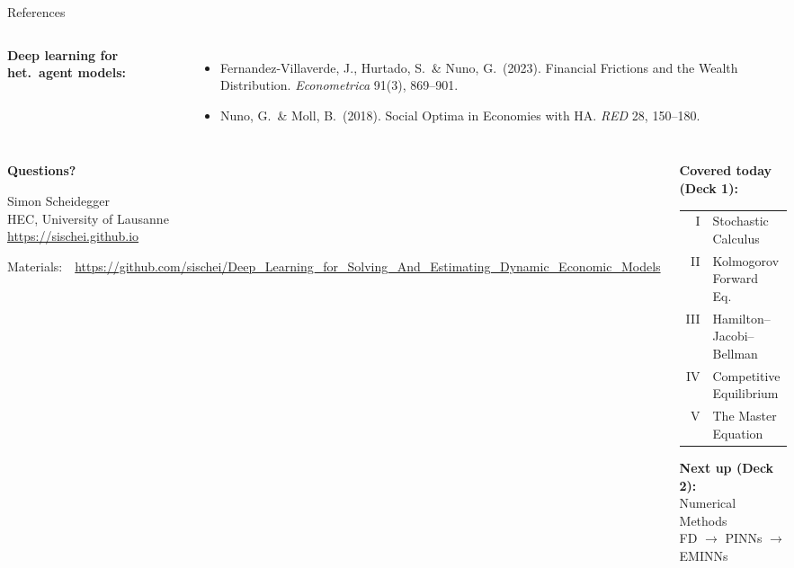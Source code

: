 \documentclass[aspectratio=169,11pt]{beamer}
\begin{document}
\begin{frame}{References}
\begin{columns}[T]
\vspace{0.3em}
\textbf{Deep learning for het.\ agent models:}
\begin{itemize}\itemsep1pt
    \item Fernandez-Villaverde, J., Hurtado, S.\ \& Nuno, G.\ (2023). Financial Frictions and the Wealth Distribution. \emph{Econometrica} 91(3), 869--901.
    \item Nuno, G.\ \& Moll, B.\ (2018). Social Optima in Economies with HA. \emph{RED} 28, 150--180.
\end{itemize}
\end{columns}
\end{frame}

\begin{frame}{}
\begin{columns}[c]
\begin{center}
{\Huge \textcolor{uzhblue}{\textbf{Questions?}}}

\vspace{1.0cm}
{\large Simon Scheidegger}\\[4pt]
{\small HEC, University of Lausanne}\\[4pt]
\url{https://sischei.github.io}

\vspace{0.6cm}
{\small Materials:~~\url{https://github.com/sischei/Deep_Learning_for_Solving_And_Estimating_Dynamic_Economic_Models}}
\end{center}

\begin{center}
\textbf{Covered today (Deck 1):}\\[8pt]
{\small
\begin{tabular}{rl}
I & Stochastic Calculus \\
II & Kolmogorov Forward Eq. \\
III & Hamilton--Jacobi--Bellman \\
IV & Competitive Equilibrium \\
V & The Master Equation \\
\end{tabular}
}

\vspace{0.8cm}
\textbf{Next up (Deck 2):}\\[6pt]
{\large Numerical Methods}\\
{\large FD $\to$ PINNs $\to$ EMINNs}\\[8pt]
\end{center}
\end{columns}
\end{frame}
\end{document}
